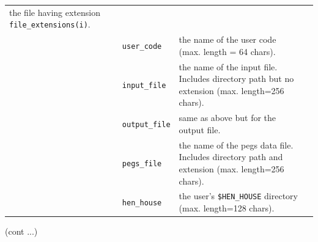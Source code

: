 \begin{table}[htb]
\begin{center}
\begin{tabular}{ l  l   p{105mm}l  |}
the file having extension {\tt file\_extensions(i)}.\\
& {\tt user\_code} & the name of the user code (max. length = 64 chars).\\
& {\tt input\_file} & the name of the input file.  Includes directory path but
no extension (max. length=256 chars).\\
& {\tt output\_file} & same as above but for the output file.\\
& {\tt pegs\_file} & the name of the pegs data file.  Includes directory path
and extension (max. length=256 chars).\\
& {\tt hen\_house} & the user's {\tt \$HEN\_HOUSE} directory (max. length=128 chars).\\
\hline
    \end{tabular}
    \end{center}
    \mbox{}\hfill (cont ...)\\
    \end{table}
    \clearpage

